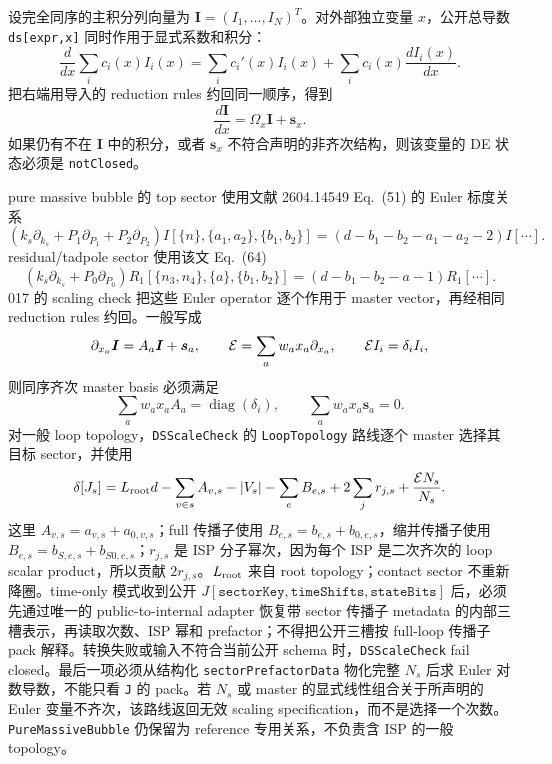 ﻿\documentclass[a4paper,11pt]{article}
\begin{document}
设完全同序的主积分列向量为 $\bm I=(I_1,\ldots,I_N)^T$。对外部独立变量 $x$，公开总导数 \texttt{ds[expr,x]} 同时作用于显式系数和积分：
\begin{equation}
 \frac{d}{dx}\sum_i c_i(x)I_i(x)
 =\sum_i c_i'(x)I_i(x)+\sum_i c_i(x)\frac{dI_i(x)}{dx}.
\end{equation}
把右端用导入的 reduction rules 约回同一顺序，得到
\begin{equation}
 \frac{d\bm I}{dx}=\Omega_x\bm I+\bm s_x.
\end{equation}
如果仍有不在 $\bm I$ 中的积分，或者 $\bm s_x$ 不符合声明的非齐次结构，则该变量的 DE 状态必须是 \texttt{notClosed}。

pure massive bubble 的 top sector 使用文献 2604.14549 Eq.~(51) 的 Euler 标度关系
\begin{equation}
 \left(k_s\partial_{k_s}+P_1\partial_{P_1}+P_2\partial_{P_2}\right)
 I[\{n\},\{a_1,a_2\},\{b_1,b_2\}]
 =\left(d-b_1-b_2-a_1-a_2-2\right)I[\cdots].
 \label{eq:loop-top-scaling}
\end{equation}
residual/tadpole sector 使用该文 Eq.~(64)
\begin{equation}
 \left(k_s\partial_{k_s}+P_0\partial_{P_0}\right)
 R_1[\{n_3,n_4\},\{a\},\{b_1,b_2\}]
 =\left(d-b_1-b_2-a-1\right)R_1[\cdots].
 \label{eq:loop-residual-scaling}
\end{equation}
017 的 scaling check 把这些 Euler operator 逐个作用于 master vector，再经相同 reduction rules 约回。一般写成
\begin{equation}
 \partial_{x_a}\bm I=A_a\bm I+\bm s_a,
 \qquad {\cal E}=\sum_a w_a x_a\partial_{x_a},
 \qquad {\cal E}I_i=\delta_i I_i,
\end{equation}
则同序齐次 master basis 必须满足
\begin{equation}
 \sum_a w_a x_a A_a=\operatorname{diag}(\delta_i),
 \qquad \sum_a w_a x_a\bm s_a=0.
\end{equation}
对一般 loop topology，\texttt{DSScaleCheck} 的 \texttt{LoopTopology} 路线逐个 master 选择其目标 sector，并使用
\begin{equation}
 \delta\!\left[J_s\right]
 =L_{\rm root}d-\sum_{v\in s}A_{v,s}-|V_s|-\sum_e B_{e,s}
  +2\sum_j r_{j,s}+\frac{{\cal E}N_s}{N_s}.
 \label{eq:general-loop-scaling-degree}
\end{equation}
这里 $A_{v,s}=a_{v,s}+a_{0,v,s}$；full 传播子使用 $B_{e,s}=b_{e,s}+b_{0,e,s}$，缩并传播子使用 $B_{e,s}=b_{S,e,s}+b_{S0,e,s}$；$r_{j,s}$ 是 ISP 分子幂次，因为每个 ISP 是二次齐次的 loop scalar product，所以贡献 $2r_{j,s}$。$L_{\rm root}$ 来自 root topology；contact sector 不重新降圈。time-only 模式收到公开 $J[\texttt{sectorKey},\texttt{timeShifts},\texttt{stateBits}]$ 后，必须先通过唯一的 public-to-internal adapter 恢复带 sector 传播子 metadata 的内部三槽表示，再读取次数、ISP 幂和 prefactor；不得把公开三槽按 full-loop 传播子 pack 解释。转换失败或输入不符合当前公开 schema 时，\texttt{DSScaleCheck} fail closed。最后一项必须从结构化 \texttt{sectorPrefactorData} 物化完整 $N_s$ 后求 Euler 对数导数，不能只看 \texttt{J} 的 pack。若 $N_s$ 或 master 的显式线性组合关于所声明的 Euler 变量不齐次，该路线返回无效 scaling specification，而不是选择一个次数。\texttt{PureMassiveBubble} 仍保留为 reference 专用关系，不负责含 ISP 的一般 topology。
\end{document}

